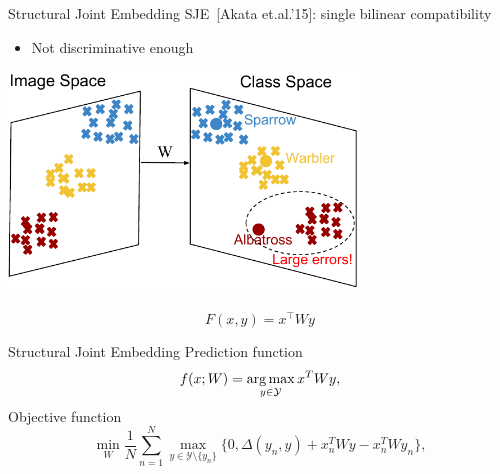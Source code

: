 \documentclass[mathserif, xcolor=table]{beamer}
\def\D{\Delta}
\def\Y{\mathcal{Y}}
\def\argmax{\mathop{\rm arg\,max}\limits}%
\def\Y{\mathcal{Y}}
\begin{document}
\begin{frame}{Structural Joint Embedding}
SJE~[Akata et.al.'15]: \alert{single bilinear} compatibility
\begin{itemize}
	\item Not discriminative enough	
\end{itemize}
\begin{center}
\includegraphics[width=0.7\textwidth]{linear_teaser}
\end{center}
\vspace{-6mm}
\begin{equation*}
F(x,y) = x^\top W y 
\end{equation*}

\end{frame}

\begin{frame}{Structural Joint Embedding}
Prediction function
\begin{equation*}
f(x; W) = \argmax_{y\in \Y} x^T W y, 
\end{equation*}
Objective function
\begin{equation*}
    \min_W \frac{1}{N} \sum_{n=1}^{N} \max_{y\in \Y \setminus \{y_n\}} \{0, \D(y_n,y) + x_n^T W y-x_n^T W y_n\},
\end{equation*}

\end{frame}
\end{document}
